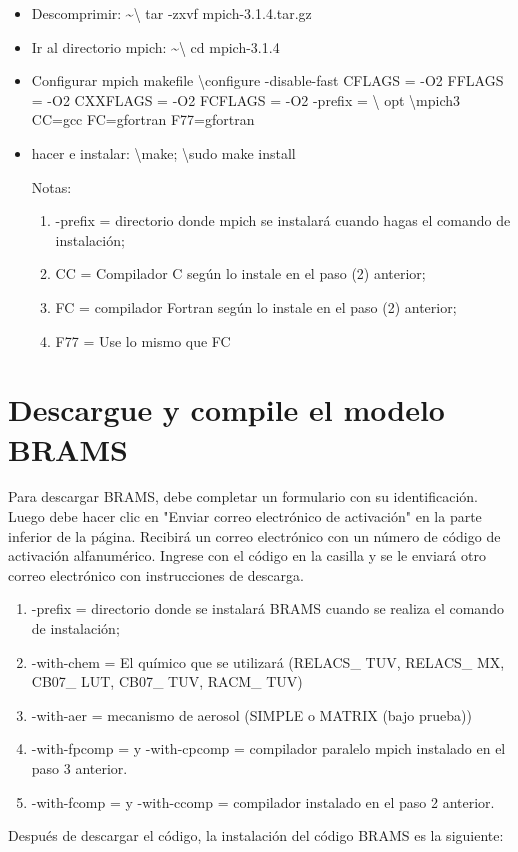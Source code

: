 \documentclass[12pt,letterpaper]{article}
\begin{document}
\begin{itemize}
\item Descomprimir: \textasciitilde \textbackslash{} tar -zxvf mpich-3.1.4.tar.gz
 \item Ir al directorio mpich: \textasciitilde \textbackslash{} cd mpich-3.1.4
 \item Configurar mpich makefile  \textbackslash{}configure -disable-fast CFLAGS = -O2 FFLAGS = -O2 CXXFLAGS = -O2 FCFLAGS = -O2 -prefix = \textbackslash{} opt \textbackslash{}mpich3 CC=gcc FC=gfortran F77=gfortran
 \item hacer e instalar: \textbackslash{}make; \textbackslash{}sudo make install
 
 Notas:
\begin{enumerate}[1.]
\item -prefix = directorio donde mpich se instalará cuando hagas el comando de instalación;
\item CC = Compilador C según lo instale en el paso (2) anterior;
\item FC = compilador Fortran según lo instale en el paso (2) anterior;
\item F77 = Use lo mismo que FC

\end{enumerate}
 
 

\end{itemize}
\section{Descargue y compile el modelo BRAMS}
Para descargar BRAMS, debe completar un formulario con su identificación. Luego debe hacer clic en "Enviar correo electrónico de activación" en la parte inferior de la página. Recibirá un correo electrónico con un número de código de activación alfanumérico. Ingrese con el código en la casilla y se le enviará otro correo electrónico con instrucciones de descarga.

\begin{enumerate}[1.]
\item -prefix = directorio donde se instalará BRAMS cuando se realiza el comando de instalación;
\item -with-chem = El químico que se utilizará (RELACS\_ TUV, RELACS\_ MX, CB07\_ LUT, CB07\_ TUV, RACM\_ TUV)
\item -with-aer = mecanismo de aerosol (SIMPLE o MATRIX (bajo prueba))
\item -with-fpcomp = y -with-cpcomp = compilador paralelo mpich instalado en el paso 3 anterior.
\item -with-fcomp = y -with-ccomp = compilador instalado en el paso 2 anterior.


\end{enumerate}
Después de descargar el código, la instalación del código BRAMS es la siguiente:
\end{document}
